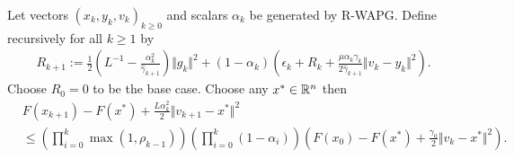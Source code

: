 \documentclass[12pt]{article}
\begin{document}
    \begin{proposition}\label{prop:wagp-convergence}
        Let vectors $(x_k, y_k, v_k)_{k \ge0}$ and scalars $\alpha_k$ be generated by R-WAPG. 
        Define recursively for all $k\ge1$ by 
        \begin{align*}
        R_{k + 1}
        := 
        \frac{1}{2}\left(
            L^{-1} - \frac{\alpha_k^2}{\hat \gamma_{k + 1}}
        \right)\Vert g_k\Vert^2
        + 
        (1 - \alpha_k)
        \left(
            \epsilon_k + R_k + 
            \frac{\mu\alpha_k\gamma_k}{2\hat \gamma_{k + 1}}
            \Vert v_k - y_k\Vert^2
        \right). 
        \end{align*}
        Choose $R_0= 0$ to be the base case. 
        Choose any $x^* \in \mathbb R^n$ then
        \begin{align*}
            & F(x_{k + 1}) - F(x^*) + \frac{L \alpha_k^2}{2}\Vert v_{k + 1} - x^*\Vert^2
            \\
            &\le 
            \left(
                \prod_{i = 0}^{k} \max(1, \rho_{k - 1})
            \right)
            \left(
                \prod_{i = 0}^{k} \left(1  - \alpha_i\right)
            \right)
            \left(
                F(x_0) - F(x^*) + \frac{\gamma_0}{2}\Vert v_k - x^*\Vert^2
            \right). 
        \end{align*}
    \end{proposition}
\end{document}
